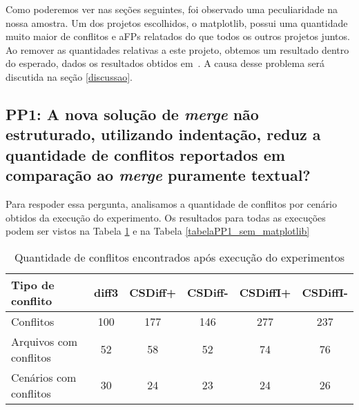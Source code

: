 Como poderemos ver nas seções seguintes, foi observado uma peculiaridade na nossa amostra. Um dos projetos escolhidos, o
matplotlib, possui uma quantidade muito maior de conflitos e aFPs relatados do que todos os outros projetos juntos. Ao remover
as quantidades relativas a este projeto, obtemos um resultado dentro do esperado, dados os resultados obtidos
em~\cite{clem21,heitor21}. A causa desse problema será discutida na seção \ref{discussao}.

\subsection{PP1: A nova solução de \emph{merge} não estruturado, utilizando indentação,
	reduz a quantidade de conflitos reportados em comparação ao \emph{merge} puramente textual?}
Para respoder essa pergunta, analisamos a quantidade de conflitos por cenário obtidos da execução do experimento. Os
resultados para todas as execuções podem ser vistos na Tabela \ref{tabelaPP1_com_matplotlib} e na
Tabela \ref{tabelaPP1_sem_matplotlib}

\begin{table}[ht]
	\begin{center}
		\begin{tabular}{|l|c|c|c|c|c|}
			\hline
			\textbf{Tipo de conflito} & \textbf{diff3} & \textbf{CSDiff+} & \textbf{CSDiff-} & \textbf{CSDiffI+} & \textbf{CSDiffI-} \\
			\hline
			Conflitos                 & 100            & 177              & 146              & 277               & 237               \\
			Arquivos com conflitos    & 52             & 58               & 52               & 74                & 76                \\
			Cenários com conflitos    & 30             & 24               & 23               & 24                & 26                \\
			\hline
		\end{tabular}
	\end{center}
	\caption{Quantidade de conflitos encontrados após execução do experimentos}\label{tabelaPP1_com_matplotlib}
\end{table}

